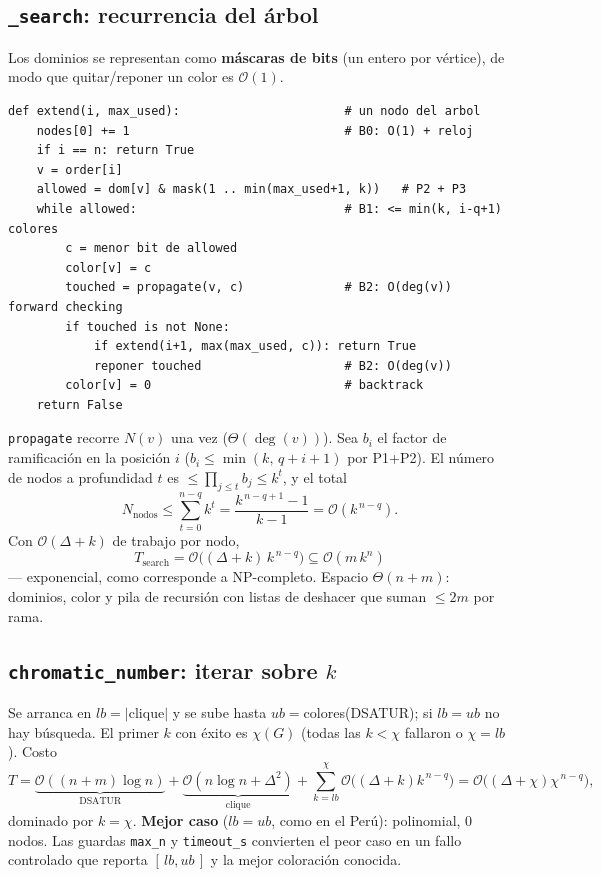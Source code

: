\documentclass[11pt,a4paper]{article}
\theoremstyle{definition}
\theoremstyle{remark}
\newcommand{\dg}{\operatorname{deg}}
\newcommand{\bigO}{\mathcal{O}}
\begin{document}
\subsection{\texttt{\_search}: recurrencia del árbol}
Los dominios se representan como \textbf{máscaras de bits} (un entero por
vértice), de modo que quitar/reponer un color es $\bigO(1)$.
\begin{lstlisting}
def extend(i, max_used):                       # un nodo del arbol
    nodes[0] += 1                              # B0: O(1) + reloj
    if i == n: return True
    v = order[i]
    allowed = dom[v] & mask(1 .. min(max_used+1, k))   # P2 + P3
    while allowed:                             # B1: <= min(k, i-q+1) colores
        c = menor bit de allowed
        color[v] = c
        touched = propagate(v, c)              # B2: O(deg(v))  forward checking
        if touched is not None:
            if extend(i+1, max(max_used, c)): return True
            reponer touched                    # B2: O(deg(v))
        color[v] = 0                           # backtrack
    return False
\end{lstlisting}
\texttt{propagate} recorre $N(v)$ una vez ($\Theta(\dg(v))$). Sea $b_i$ el factor
de ramificación en la posición $i$ ($b_i\le\min(k,\,q{+}i{+}1)$ por P1+P2). El
número de nodos a profundidad $t$ es $\le\prod_{j\le t}b_j\le k^t$, y el total
\[
N_{\text{nodos}}\le\sum_{t=0}^{n-q}k^{t}=\frac{k^{\,n-q+1}-1}{k-1}=\bigO(k^{\,n-q}).
\]
Con $\bigO(\Delta+k)$ de trabajo por nodo,
\[
\boxed{\,T_{\text{search}}=\bigO\big((\Delta+k)\,k^{\,n-q}\big)\subseteq\bigO(m\,k^{n})\,}
\]
--- exponencial, como corresponde a NP-completo. Espacio $\Theta(n+m)$: dominios,
color y pila de recursión con listas de deshacer que suman $\le 2m$ por rama.

\subsection{\texttt{chromatic\_number}: iterar sobre $k$}
Se arranca en $lb=|$clique$|$ y se sube hasta $ub=$colores(DSATUR); si $lb=ub$ no
hay búsqueda. El primer $k$ con éxito es $\chi(G)$ (todas las $k<\chi$ fallaron o
$\chi=lb$). Costo
\[
T=\underbrace{\bigO((n{+}m)\log n)}_{\text{DSATUR}}+
\underbrace{\bigO(n\log n+\Delta^2)}_{\text{clique}}+
\sum_{k=lb}^{\chi}\bigO\big((\Delta{+}k)k^{\,n-q}\big)=\bigO\big((\Delta{+}\chi)\chi^{\,n-q}\big),
\]
dominado por $k=\chi$. \textbf{Mejor caso} ($lb=ub$, como en el Perú):
polinomial, $0$ nodos. Las guardas \texttt{max\_n} y \texttt{timeout\_s}
convierten el peor caso en un fallo controlado que reporta $[\,lb,ub\,]$ y la
mejor coloración conocida.
\end{document}
